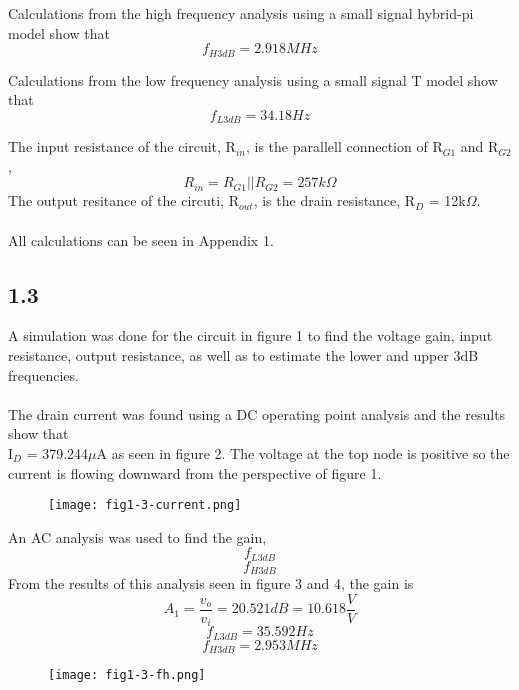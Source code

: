   Calculations from the high frequency analysis using a small signal hybrid-pi model show that $$f_{H 3dB} = 2.918MHz$$

  Calculations from the low frequency analysis using a small signal T model show that $$f_{L 3dB} = 34.18Hz$$

  The input resistance of the circuit, R$_{in}$, is the parallell connection of R$_{G1}$ and R$_{G2}$, $$R_{in} = R_{G1}||R_{G2} = 257k\Omega$$
  The output resitance of the circuti, R$_{out}$, is the drain resistance, R$_D$ = 12k$\Omega$.\\\\

  All calculations can be seen in Appendix 1.\\
\pagebreak
\subsection*{1.3}

  A simulation was done for the circuit in figure 1 to find the voltage gain, input resistance, output resistance, as well as to estimate the lower and upper 3dB frequencies.\\\\

  The drain current was found using a DC operating point analysis and the results show that \\I$_D$ = 379.244$\mu$A as seen in figure 2. The voltage at the top node is positive so the current is flowing downward from the perspective of figure 1.\\

  \begin{figure}[h!]
        \centering
        \texttt{[image: fig1-3-current.png]}
  \end{figure}

\pagebreak

  An AC analysis was used to find the gain, $$f_{L 3dB}$$ $$f_{H 3dB}$$ From the results of this analysis seen in figure 3 and 4, the gain is $$A_1 = \frac{v_o}{v_i} = 20.521 dB = 10.618 \frac{V}{V}$$ $$f_{L 3dB} = 35.592 Hz$$ $$f_{H 3dB} = 2.953MHz$$

  \begin{figure}[h!]
        \centering
        \texttt{[image: fig1-3-fh.png]}
  \end{figure}


